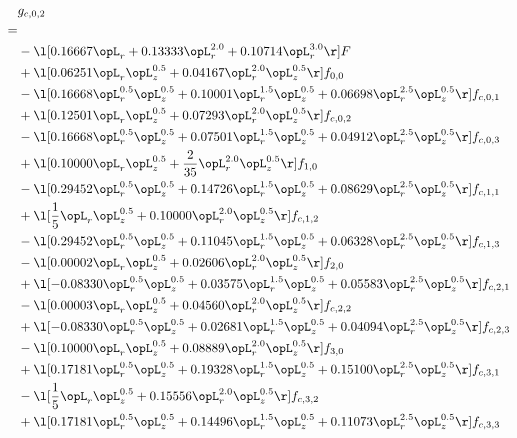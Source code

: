 \begin{alignat}{2} 
\label{eq:g_02_0} 
& g_{c,0,2} \nonumber \\ 
 = \\ 
& - \l[  0.16667 \opL_r +  0.13333 \opL_r^{2.0} +  0.10714 \opL_r^{3.0}  \r] F \nonumber \\ 
& + \l[  0.06251 \opL_r \opL_z^{0.5} +  0.04167 \opL_r^{2.0} \opL_z^{0.5}  \r] f_{0,0} \nonumber \\ 
& - \l[  0.16668 \opL_r^{0.5} \opL_z^{0.5} +  0.10001 \opL_r^{1.5} \opL_z^{0.5} +  0.06698 \opL_r^{2.5} \opL_z^{0.5}  \r] f_{c,0,1} \nonumber \\ 
& + \l[  0.12501 \opL_r \opL_z^{0.5} +  0.07293 \opL_r^{2.0} \opL_z^{0.5}  \r] f_{c,0,2} \nonumber \\ 
& - \l[  0.16668 \opL_r^{0.5} \opL_z^{0.5} +  0.07501 \opL_r^{1.5} \opL_z^{0.5} +  0.04912 \opL_r^{2.5} \opL_z^{0.5}  \r] f_{c,0,3} \nonumber \\ 
& + \l[  0.10000 \opL_r \opL_z^{0.5} + \frac{2}{35} \opL_r^{2.0} \opL_z^{0.5}  \r] f_{1,0} \nonumber \\ 
& - \l[  0.29452 \opL_r^{0.5} \opL_z^{0.5} +  0.14726 \opL_r^{1.5} \opL_z^{0.5} +  0.08629 \opL_r^{2.5} \opL_z^{0.5}  \r] f_{c,1,1} \nonumber \\ 
& + \l[ \frac{1}{5} \opL_r \opL_z^{0.5} +  0.10000 \opL_r^{2.0} \opL_z^{0.5}  \r] f_{c,1,2} \nonumber \\ 
& - \l[  0.29452 \opL_r^{0.5} \opL_z^{0.5} +  0.11045 \opL_r^{1.5} \opL_z^{0.5} +  0.06328 \opL_r^{2.5} \opL_z^{0.5}  \r] f_{c,1,3} \nonumber \\ 
& - \l[  0.00002 \opL_r \opL_z^{0.5} +  0.02606 \opL_r^{2.0} \opL_z^{0.5}  \r] f_{2,0} \nonumber \\ 
& + \l[  -0.08330 \opL_r^{0.5} \opL_z^{0.5} +  0.03575 \opL_r^{1.5} \opL_z^{0.5} +  0.05583 \opL_r^{2.5} \opL_z^{0.5}  \r] f_{c,2,1} \nonumber \\ 
& - \l[  0.00003 \opL_r \opL_z^{0.5} +  0.04560 \opL_r^{2.0} \opL_z^{0.5}  \r] f_{c,2,2} \nonumber \\ 
& + \l[  -0.08330 \opL_r^{0.5} \opL_z^{0.5} +  0.02681 \opL_r^{1.5} \opL_z^{0.5} +  0.04094 \opL_r^{2.5} \opL_z^{0.5}  \r] f_{c,2,3} \nonumber \\ 
& - \l[  0.10000 \opL_r \opL_z^{0.5} +  0.08889 \opL_r^{2.0} \opL_z^{0.5}  \r] f_{3,0} \nonumber \\ 
& + \l[  0.17181 \opL_r^{0.5} \opL_z^{0.5} +  0.19328 \opL_r^{1.5} \opL_z^{0.5} +  0.15100 \opL_r^{2.5} \opL_z^{0.5}  \r] f_{c,3,1} \nonumber \\ 
& - \l[ \frac{1}{5} \opL_r \opL_z^{0.5} +  0.15556 \opL_r^{2.0} \opL_z^{0.5}  \r] f_{c,3,2} \nonumber \\ 
& + \l[  0.17181 \opL_r^{0.5} \opL_z^{0.5} +  0.14496 \opL_r^{1.5} \opL_z^{0.5} +  0.11073 \opL_r^{2.5} \opL_z^{0.5}  \r] f_{c,3,3} \nonumber \\ 
\end{alignat} 


